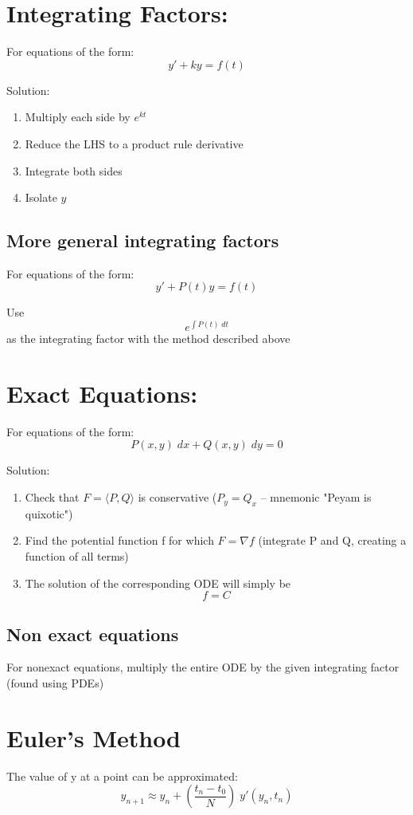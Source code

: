 \documentclass[12pt]{article}
\begin{document}
\section{Integrating Factors:}
For equations of the form:
\[y' + ky = f(t)\]

Solution:
\begin{enumerate}
    \item Multiply each side by $e^{kt}$
    \item Reduce the LHS to a product rule derivative
    \item Integrate both sides
    \item Isolate $y$
\end{enumerate}

\subsection*{More general integrating factors}
For equations of the form:
\[y' + P(t) y = f(t)\]

Use 
\[e^{\int P(t) \; dt}\]
as the integrating factor with the method described above

\section{Exact Equations:}
For equations of the form:
\[P(x, y)\; dx + Q(x, y)\; dy = 0\]

Solution:
\begin{enumerate}
    \item Check that $F = \langle P, Q \rangle$ is conservative ($P_y = Q_x$ -- mnemonic "Peyam is quixotic")
    \item Find the potential function f for which $F = \nabla f$ (integrate P and Q, creating a function of all terms)
    \item The solution of the corresponding ODE will simply be 
    \[\boxed{f = C}\]
\end{enumerate}

\subsection*{Non exact equations}
For nonexact equations, multiply the entire ODE by the given integrating factor (found using PDEs)

\section{Euler's Method}
The value of y at a point can be approximated:
\[y_{n + 1} \approx y_n + \left(\frac{t_n - t_0}{N}\right) \; y'(y_n, t_n)\]
\end{document}
